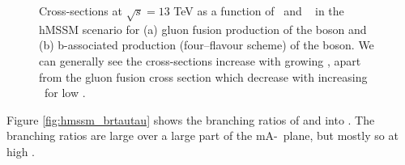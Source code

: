 \begin{figure}[h!]
\begin{center}
\end{center}
\caption{Cross-sections at $\sqrt{s}=13$ TeV as a function of
\mA~and \tanb~ in 
the hMSSM scenario for (a) gluon fusion production of the \PHiggsps boson and (b)
b-associated production (four--flavour scheme) of the \PHiggs boson. We can generally see the cross-sections increase
with growing \tanb, apart from the gluon fusion cross section which decrease with increasing
\tanb~for low \tanb.}
\label{fig:hmssm_xs}
\end{figure}

Figure \ref{fig:hmssm_brtautau} shows the branching ratios of \PHiggsps and \PHiggs into \Pgt\Pgt.
The branching ratios are large over a large part of the mA-\tanb~plane, but mostly so
at high \tanb.

